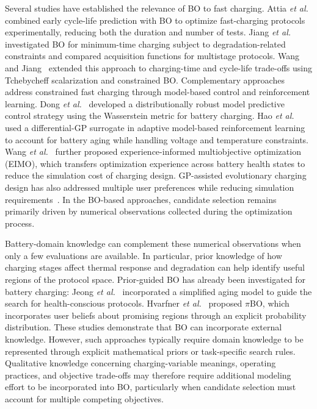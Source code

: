 \documentclass[lettersize,journal]{IEEEtran}
\begin{document}
Several studies have established the relevance of BO to fast charging.
Attia \emph{et al.}~\cite{nref3} combined early cycle-life prediction with BO
to optimize fast-charging protocols experimentally, reducing both the duration
and number of tests. Jiang \emph{et al.}~\cite{nref7} investigated BO for
minimum-time charging subject to degradation-related constraints and compared
acquisition functions for multistage protocols. Wang and Jiang~\cite{nref8}
extended this approach to charging-time and cycle-life trade-offs using
Tchebycheff scalarization and constrained BO. Complementary approaches address
constrained fast charging through model-based control and reinforcement
learning. Dong \emph{et al.}~\cite{refDongBO} developed a distributionally robust
model predictive control strategy using the Wasserstein metric for battery
charging. Hao \emph{et al.}~\cite{refZhuMOBO} used a differential-GP surrogate
in adaptive model-based reinforcement learning to account for battery aging
while handling voltage and temperature constraints.
Wang \emph{et al.}~\cite{refEIMO} further proposed experience-informed
multiobjective optimization (EIMO), which transfers optimization experience
across battery health states to reduce the simulation cost of charging design.
GP-assisted evolutionary charging design has also addressed multiple user
preferences while reducing simulation requirements~\cite{refGPA}. In the
BO-based approaches, candidate selection remains primarily driven by numerical
observations collected during the optimization process.

Battery-domain knowledge can complement these numerical observations when only
a few evaluations are available. In particular, prior knowledge of how
charging stages affect thermal response and degradation can help identify
useful regions of the protocol space. Prior-guided BO has already been
investigated for battery charging: Jeong \emph{et al.}~\cite{refPriorCharging}
incorporated a simplified aging model to guide the search for health-conscious
protocols. Hvarfner \emph{et al.}~\cite{refPiBO} proposed $\pi$BO, which
incorporates user beliefs about promising regions through an explicit
probability distribution. These studies demonstrate that BO can incorporate
external knowledge. However, such approaches typically require domain
knowledge to be represented through explicit mathematical priors or
task-specific search rules. Qualitative knowledge concerning charging-variable
meanings, operating practices, and objective trade-offs may therefore require
additional modeling effort to be incorporated into BO, particularly when
candidate selection must account for multiple competing objectives.
\end{document}
